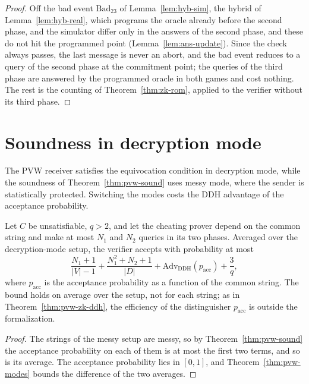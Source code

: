 \begin{proof}
  \leanok
  Off the bad event $\mathrm{Bad}_{23}$ of Lemma~\ref{lem:hyb-sim}, the hybrid of
  Lemma~\ref{lem:hyb-real}, which programs the oracle already before the second phase, and the
  simulator differ only in the answers of the second phase, and these do not hit the programmed
  point (Lemma~\ref{lem:ans-update}). Since the check always passes, the last message is never an
  abort, and the bad event reduces to a query of the second phase at the commitment point; the
  queries of the third phase are answered by the programmed oracle in both games and cost nothing.
  The rest is the counting of Theorem~\ref{thm:zk-rom}, applied to the verifier without its third
  phase.
\end{proof}

\section{Soundness in decryption mode}

The PVW receiver satisfies the equivocation condition in decryption mode, while the soundness of
Theorem~\ref{thm:pvw-sound} uses messy mode, where the sender is statistically protected. Switching
the modes costs the DDH advantage of the acceptance probability.

\begin{theorem}
  \label{thm:pvw-dec-sound}
  \leanok
  Let $C$ be unsatisfiable, $q > 2$, and let the cheating prover depend on the common string and
  make at most $N_1$ and $N_2$ queries in its two phases. Averaged over the decryption-mode setup,
  the verifier accepts with probability at most
  \[ \frac{N_1 + 1}{|V| - 1} + \frac{N_1^2 + N_2 + 1}{|D|} + \mathrm{Adv}_{\mathrm{DDH}}(p_{\mathrm{acc}})
     + \frac{3}{q} , \]
  where $p_{\mathrm{acc}}$ is the acceptance probability as a function of the common string. The bound
  holds on average over the setup, not for each string; as in Theorem~\ref{thm:pvw-zk-ddh}, the
  efficiency of the distinguisher $p_{\mathrm{acc}}$ is outside the formalization.
\end{theorem}

\begin{proof}
  \leanok
  The strings of the messy setup are messy, so by Theorem~\ref{thm:pvw-sound} the acceptance
  probability on each of them is at most the first two terms, and so is its average. The
  acceptance probability lies in $[0, 1]$, and Theorem~\ref{thm:pvw-modes} bounds the difference of
  the two averages.
\end{proof}
